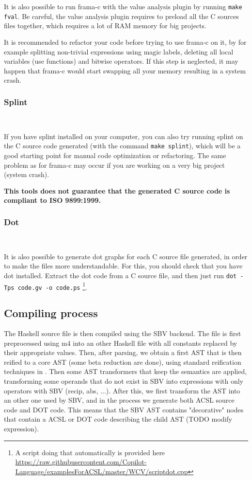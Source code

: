 It is also possible to run frama-c with the value analysis plugin by running
\texttt{make fval}. Be careful, the value analysis plugin requires to preload
all the C sources files together, which requires a lot of RAM memory for big
projects.

It is recommended to refactor your code before trying to use frama-c on it, by for example splitting non-trivial expressions using magic labels, deleting all
local variables (use functions) and bitwise operators. If this step is
neglected, it may happen that frama-c would start swapping all your memory
resulting in a system crash.

\subsubsection{Splint}~\label{subsec:splint}

If you have splint installed on your computer, you can also try running splint on the C source code generated (with the command \texttt{make splint}), which will be a good starting point for manual code optimization or refactoring. The same problem as for frama-c may occur if you are working on a very big project (system crash).

\textbf{This tools does not guarantee that the generated C source code is compliant to ISO 9899:1999.} 

\subsubsection{Dot}~\label{subsec:dot}

It is also possible to generate dot graphs for each C source file generated, in
order to make the files more understandable. For this, you should check that
you have dot installed. Extract the dot code from a C source file, and then
just run \texttt{dot -Tps code.gv -o code.ps}
%
\footnote{A script doing that automatically is provided here
\url{https://raw.githubusercontent.com/Copilot-Language/examplesForACSL/master/WCV/scriptdot.cpp}}.

\subsection{Compiling process}

The Haskell source file is then compiled using the SBV backend. The file is first preprocessed using m4 into an other Haskell file with all constants replaced by their appropriate values. Then, after parsing, we obtain a first AST that is then reified to a core AST (some beta reduction are done), using standard reification techniques in \cite{Copilot06}. Then some AST transformers that keep the semantics are applied, transforming some operands that do not exist in SBV into expressions with only operators with SBV (recip, abs, ...). After this, we first transform the AST into an other one used by SBV, and in the process we generate both ACSL source code and DOT code. This means that the SBV AST contains "decorative" nodes that contain a ACSL or DOT code describing the child AST (TODO modify expression). 

